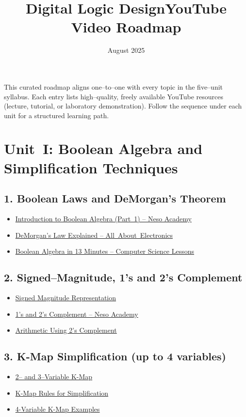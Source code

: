 \documentclass{article}
\title{Digital Logic Design\newline YouTube Video Roadmap}
\author{}
\date{August 2025}
\begin{document}
\maketitle
\noindent This curated roadmap aligns one--to--one with every topic in the five--unit syllabus.  Each entry lists high--quality, freely available YouTube resources (lecture, tutorial, or laboratory demonstration).  Follow the sequence under each unit for a structured learning path.

\section*{Unit~I: Boolean Algebra and Simplification Techniques}
\subsection*{1. Boolean Laws and DeMorgan’s Theorem}
\begin{itemize}
  \item \href{https://www.youtube.com/watch?v=WW-NPtIzHwk}{Introduction to Boolean Algebra (Part~1) -- Neso Academy}
  \item \href{https://www.youtube.com/watch?v=W7YTfLaPWRY}{DeMorgan's Law Explained -- All~About~Electronics}
  \item \href{https://www.youtube.com/watch?v=cTjFy18SjRc}{Boolean Algebra in 13 Minutes -- Computer Science Lessons}
\end{itemize}
\subsection*{2. Signed--Magnitude, 1’s and 2’s Complement}
\begin{itemize}
  \item \href{https://www.youtube.com/watch?v=zMX2WERv74k}{Signed Magnitude Representation}
  \item \href{https://www.youtube.com/watch?v=S_fPMrrIA30}{1’s and 2’s Complement -- Neso Academy}
  \item \href{https://www.youtube.com/watch?v=brM0tpBAx8U}{Arithmetic Using 2’s Complement}
\end{itemize}
\subsection*{3. K-Map Simplification (up to 4 variables)}
\begin{itemize}
  \item \href{https://www.youtube.com/watch?v=lw1STgKUpW0}{2– and 3–Variable K-Map}
  \item \href{https://www.youtube.com/watch?v=A_LFVBWYZME}{K-Map Rules for Simplification}
  \item \href{https://www.youtube.com/watch?v=AjmgA6dTJlA}{4-Variable K-Map Examples}
\end{itemize}
\end{document}
